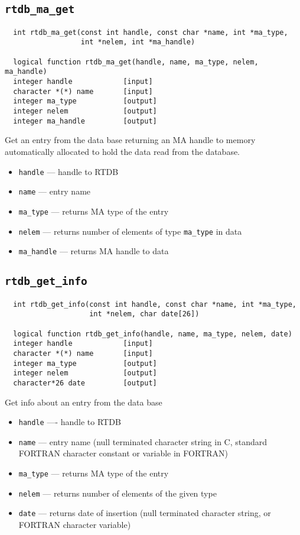\subsection{{\tt rtdb\_ma\_get}}
\begin{verbatim}
  int rtdb_ma_get(const int handle, const char *name, int *ma_type,
                  int *nelem, int *ma_handle)

  logical function rtdb_ma_get(handle, name, ma_type, nelem, ma_handle)
  integer handle            [input]
  character *(*) name       [input]
  integer ma_type           [output]
  integer nelem             [output]
  integer ma_handle         [output]
\end{verbatim}
Get an entry from the data base returning an MA handle to memory
automatically allocated to hold the data read from the database.
\begin{itemize}  
\item {\tt handle} --- handle to RTDB
\item {\tt name} --- entry name
\item {\tt ma\_type} --- returns MA type of the entry
\item {\tt nelem} --- returns number of elements of type {\tt ma\_type} in data
\item {\tt ma\_handle} --- returns MA handle to data
\end{itemize}


\subsection{{\tt rtdb\_get\_info}}
\begin{verbatim}
  int rtdb_get_info(const int handle, const char *name, int *ma_type, 
                    int *nelem, char date[26])

  logical function rtdb_get_info(handle, name, ma_type, nelem, date)
  integer handle            [input]
  character *(*) name       [input]
  integer ma_type           [output]
  integer nelem             [output]
  character*26 date         [output]
\end{verbatim}
Get info about an entry from the data base
\begin{itemize}
\item {\tt handle} ---- handle to RTDB
\item {\tt name} --- entry name (null terminated character string in
  C,  standard FORTRAN character constant or variable in FORTRAN)
\item {\tt ma\_type} --- returns MA type of the entry
\item {\tt nelem} --- returns number of elements of the given type
\item {\tt date} --- returns date of insertion (null terminated
  character string, or FORTRAN character variable)
\end{itemize}


